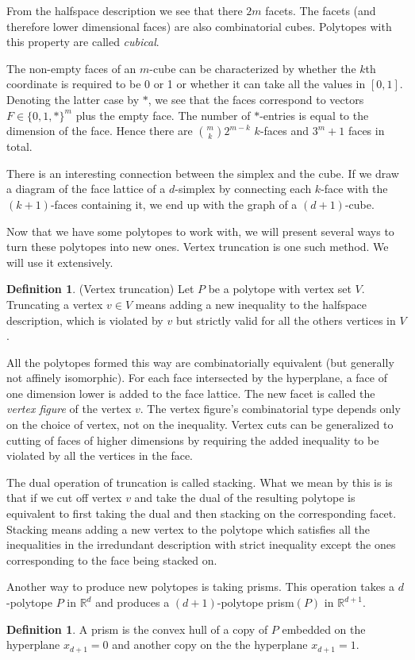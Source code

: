 \documentclass[a4paper,12pt]{book}
\theoremstyle{plain}
\theoremstyle{definition}
\newtheorem{definition}[theorem]{Definition}
\begin{document}
From the halfspace description we see that there $2m$ facets. The facets (and therefore lower dimensional faces)
are also combinatorial cubes. Polytopes with this property are called \textit{cubical}. 

The non-empty faces of an $m$-cube can be characterized by whether the $k$th coordinate 
is required to be 0 or 1 or whether it can take all the values in $[0,1]$. Denoting the latter case by $*$, we see
that the faces correspond to vectors $F \in \{0,1,*\}^m$ plus the empty face. The number of $*$-entries 
is equal to the dimension of the face. Hence there are $\binom{m}{k} 2^{m-k}$ $k$-faces and $3^m +1$ faces in total.

There is an interesting connection between the simplex and the cube. If we draw a diagram
of the face lattice of a $d$-simplex by connecting each $k$-face with the $(k+1)$-faces containing it,
we end up with the graph of a $(d+1)$-cube.

Now that we have some polytopes to work with, we will present several ways to turn these polytopes into new ones.
Vertex truncation is one such method.
We will use it extensively.
\begin{definition}
(Vertex truncation) Let $P$ be a polytope with vertex set $V$. Truncating a vertex $v \in V$ means adding
a new inequality to the halfspace description, which is violated by $v$ but strictly valid for all the others vertices in $V$.
\end{definition}
All the polytopes formed this way are combinatorially equivalent (but generally not affinely isomorphic). 
For each face intersected by the hyperplane, 
a face of one dimension lower is added to the face lattice. The new facet is 
called the \textit{vertex figure} of the vertex $v$. The vertex figure's combinatorial type 
depends only on the choice of vertex, not on the inequality. Vertex cuts can be generalized to cutting of 
faces of higher dimensions by requiring the added inequality to be violated by 
all the vertices in the face. 

The dual operation of truncation is called stacking. What we mean by this is is that if we cut off vertex $v$
and take the dual of the resulting polytope is equivalent to first taking the dual and then stacking on the
corresponding facet.
Stacking means adding a new vertex to the polytope which satisfies all the 
inequalities in the irredundant description with strict inequality except the 
ones corresponding to the face being stacked on.

Another way to produce new polytopes is taking prisms. This operation takes a 
$d$-polytope $P$ in $\mathbb{R}^d$ and produces a $(d+1)$-polytope prism$(P)$ in 
$\mathbb{R}^{d+1}$. 
\begin{definition}
 A prism is the convex hull of a copy of $P$ embedded on the hyperplane 
$x_{d+1} = 0$ and another copy on the the hyperplane $x_{d+1} = 1$.
\end{definition}
\end{document}
